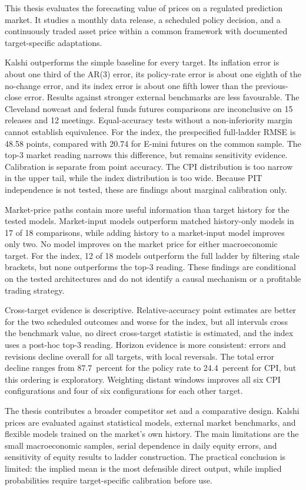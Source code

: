 \documentclass[12pt,a4paper]{report}
\begin{document}
This thesis evaluates the forecasting value of prices on a regulated
prediction market. It studies a monthly data release, a scheduled policy
decision, and a continuously traded asset price within a common framework with
documented target-specific adaptations.

Kalshi outperforms the simple baseline for every target. Its inflation error is
about one third of the AR(3) error, its policy-rate error is about one eighth of
the no-change error, and its index error is about one fifth lower than the
previous-close error. Results against stronger external benchmarks are less
favourable. The Cleveland nowcast and federal funds futures comparisons are
inconclusive on 15 releases and 12 meetings. Equal-accuracy tests without a
non-inferiority margin cannot establish equivalence. For the index, the
prespecified full-ladder RMSE is 48.58 points, compared with 20.74 for E-mini
futures on the common sample. The top-3 market reading narrows this difference,
but remains sensitivity evidence. Calibration is separate from point accuracy.
The CPI distribution is too narrow in the upper tail, while the index
distribution is too wide. Because PIT independence is not tested, these are
findings about marginal calibration only.

Market-price paths contain more useful information than target history for the
tested models. Market-input models outperform matched history-only models in
17 of 18 comparisons, while adding history to a market-input model improves
only two. No model improves on the market price for either macroeconomic
target. For the index, 12 of 18 models outperform the full ladder by filtering
stale brackets, but none outperforms the top-3 reading. These findings are
conditional on the tested architectures and do not identify a causal mechanism
or a profitable trading strategy.

Cross-target evidence is descriptive. Relative-accuracy point estimates are
better for the two scheduled outcomes and worse for the index, but all
intervals cross the benchmark value, no direct cross-target statistic is
estimated, and the index uses a post-hoc top-3 reading. Horizon evidence is
more consistent: errors and revisions decline overall for all targets, with
local reversals. The total error decline ranges from 87.7~percent for the
policy rate to 24.4~percent for CPI, but this ordering is exploratory.
Weighting distant windows improves all six CPI configurations and four of six
configurations for each other target.

The thesis contributes a broader competitor set and a comparative design.
Kalshi prices are evaluated against statistical models, external
market benchmarks, and flexible models trained on the market's own history.
The main limitations are the small macroeconomic samples, serial dependence in
daily equity errors, and sensitivity of equity results to ladder construction.
The practical conclusion is limited: the implied mean is the most defensible
direct output, while implied probabilities require target-specific calibration
before use.
 
\end{document}
